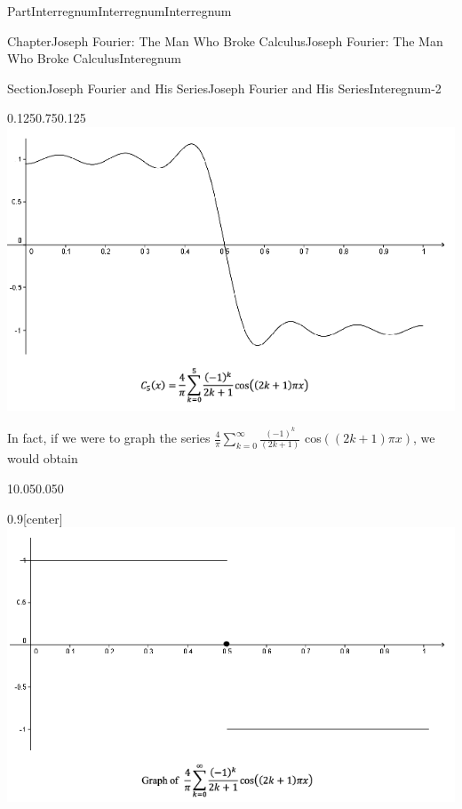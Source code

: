 \documentclass[oneside,10pt,]{book}
\numberwithin{equation}{part}
\begin{document}
\begin{partptx}{Part}{Interregnum}{}{Interregnum}{}{}{Interregnum}
\begin{chapterptx}{Chapter}{Joseph Fourier: The Man Who Broke Calculus}{}{Joseph Fourier: The Man Who Broke Calculus}{}{}{Interegnum}
\begin{sectionptx}{Section}{Joseph Fourier and His Series}{}{Joseph Fourier and His Series}{}{}{Interegnum-2}
\begin{image}{0.125}{0.75}{0.125}{}
\includegraphics[width=\linewidth]{external/images/FourierEx8.png}
\end{image}%
In fact, if we were to graph the series \(\frac{4}{\pi}\sum_{k=0}^\infty\frac{\left(-1\right)^k}{\left(2k+1\right)}\) cos\(\left(\left(2k+1\right)\pi x\right)\), we would obtain%
\begin{sidebyside}{1}{0.05}{0.05}{0}%
\begin{sbspanel}{0.9}[center]%
\includegraphics[width=\linewidth]{external/images/FourierEx10.png}
\end{sbspanel}%
\end{sidebyside}%
\par

\end{sectionptx}
\end{chapterptx}
\end{partptx}
\end{document}
